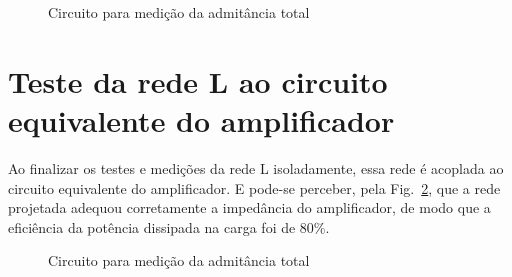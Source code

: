 \documentclass[
  number,
  preprint]{elsarticle}
\begin{document}
\begin{figure}


\caption{\label{fig-reflex-allfreq}Circuito para medição da admitância
total}

\end{figure}%

\section{Teste da rede L ao circuito equivalente do
amplificador}\label{teste-da-rede-l-ao-circuito-equivalente-do-amplificador}

Ao finalizar os testes e medições da rede L isoladamente, essa rede é
acoplada ao circuito equivalente do amplificador. E pode-se perceber,
pela Fig.~\ref{fig-test-Lnet}, que a rede projetada adequou corretamente
a impedância do amplificador, de modo que a eficiência da potência
dissipada na carga foi de 80\%.

\begin{figure}


\caption{\label{fig-test-Lnet}Circuito para medição da admitância total}

\end{figure}%
\end{document}
